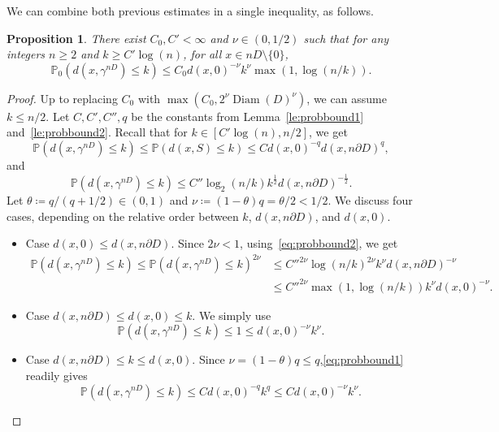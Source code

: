 \documentclass[11pt]{article}
\newtheorem{proposition}[theorem]{Proposition}
\begin{document}
We can combine both previous estimates in a single inequality, as follows. 

\begin{proposition}
    \label{prop:probbound}
    There exist $C_0,C'<\infty$ and $\nu\in(0,1/2)$ such that for any integers $n\geq 2$ and $k\geq C'  \log(n)$, for all $x\in n D\setminus\{0\}$,
    \[
    \mathbb{P}_0( d(x,\gamma^{nD})\leq k )\leq C_0 d(x, 0)^{-\nu}  k^\nu \max(1, \log(n/k )).\]
\end{proposition}
\begin{proof}
    Up to replacing $C_0$ with $\max(C_0, 2^\nu \operatorname{Diam}(D)^{\nu})$, we can assume $k\leq n/2$.
    Let $C,C',C'',q$ be the constants from Lemma~\ref{le:probbound1} and~\ref{le:probbound2}. Recall that for $k\in [C'\log(n),n/2]$, we get
    \begin{equation}
    \label{eq:probbound1}
    \mathbb{P}( d(x,\gamma^{nD})\leq k )\leq \mathbb{P}( d(x,S) \leq k)\leq C  d(x,0)^{-q} d(x,n \partial D)^q,\end{equation}
    and
    \begin{equation}
    \label{eq:probbound2}
    \mathbb{P}( d(x,\gamma^{nD})\leq k )\leq C'' \log_2(n/k ) k^{\frac{1}{2}} d(x, n \partial D )^{-\frac{1}{2}}.
    \end{equation}
    Let $\theta\coloneqq q/(q+1/2)\in(0,1)$ and $\nu\coloneqq(1-\theta)q=\theta/2<1/2$. We discuss four cases, depending on the relative order between $k$, $ d(x,n \partial D)$, and $d(x,0)$.
    \begin{itemize}
    \item Case $d(x,0)\leq d(x,n \partial D)$. Since $2\nu<1$, using~\eqref{eq:probbound2}, we get
    \begin{align*}
        \mathbb{P}( d(x,\gamma^{nD})\leq k )
    \leq \mathbb{P}( d(x,\gamma^{nD})\leq k )^{2\nu}
    &\leq C''^{2\nu} \log(n/k)^{2\nu} k^\nu d(x, n\partial D )^{-\nu}\\
    &\leq C''^{2\nu} \max(1,\log(n/k)) k^\nu d(x, 0 )^{-\nu}.
    \end{align*}

  \item   Case $ d(x,n \partial D)\leq d(x,0)\leq k$. We simply use
    \[\mathbb{P}( d(x,\gamma^{nD})\leq k )\leq 1\leq  d(x,0)^{-\nu} k^\nu.
    \]

    \item Case $ d(x,n \partial D)\leq k \leq d(x,0)$. Since $\nu=(1-\theta)q\leq q$,\eqref{eq:probbound1} readily gives
    \[	 \mathbb{P}( d(x,\gamma^{nD}) \leq k)\leq C  d(x,0)^{-q} k^q\leq
    C  d(x,0)^{-\nu} k^\nu. \]




\end{itemize}
\end{proof}
\end{document}
